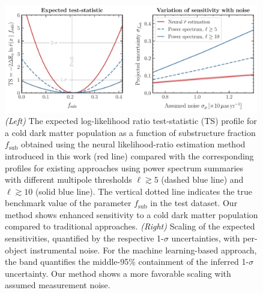 \documentclass[twocolumn,linenumbers,anonymous]{aastex631}
\begin{document}
\begin{figure}[!htbp]
\centering
\includegraphics[width=0.99\textwidth]{results}
\caption{\emph{(Left)} The expected log-likelihood ratio test-statistic (TS) profile for a cold dark matter population as a function of substructure fraction $f_\mathrm{sub}$ obtained using the neural likelihood-ratio estimation method introduced in this work (red line) compared with the corresponding profiles for existing approaches using power spectrum summaries with different multipole thresholds $\ell \gtrsim 5$ (dashed blue line) and $\ell \gtrsim 10$ (solid blue line). The vertical dotted line indicates the true benchmark value of the parameter $f_\mathrm{sub}$ in the test dataset. Our method shows enhanced sensitivity to a cold dark matter population compared to traditional approaches. \emph{(Right)} Scaling of the expected sensitivities, quantified by the respective 1-$\sigma$ uncertainties, with per-object instrumental noise. For the machine learning-based approach, the band quantifies the middle-95\% containment of the inferred 1-$\sigma$ uncertainty. Our method shows a more favorable scaling with assumed measurement noise.}
\label{fig:experiment}
\end{figure}
\end{document}
